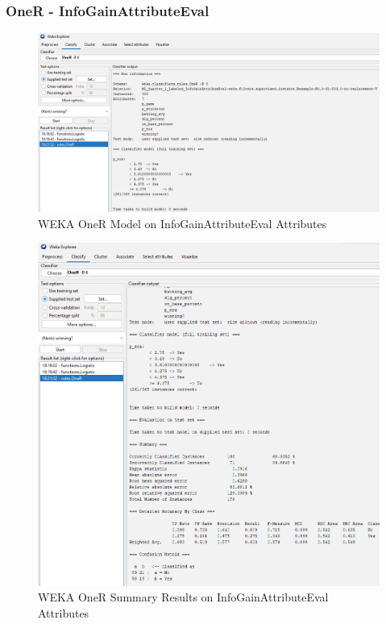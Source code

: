 \documentclass[12pt]{article}
\begin{document}
\subsubsection{OneR - InfoGainAttributeEval}
\begin{figure}[h!]
    \includegraphics[scale=0.4]{./images/InfoGainAttributeEval/OneR-Model.png}
\centering
    \caption{WEKA OneR Model on InfoGainAttributeEval Attributes}
\end{figure}
\newpage
\begin{figure}[h!]
    \includegraphics[scale=0.4]{./images/InfoGainAttributeEval/OneR-Summary.png}
\centering
    \caption{WEKA OneR Summary Results on InfoGainAttributeEval Attributes}
\end{figure}
\end{document}

